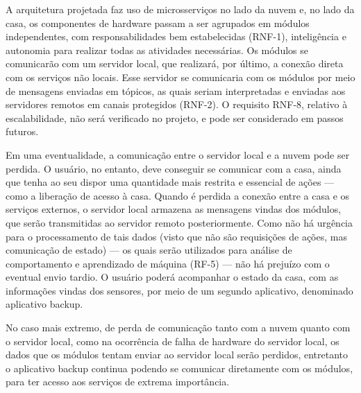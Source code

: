 A arquitetura projetada faz uso de microsserviços no lado da nuvem e, no lado da casa, os componentes de hardware passam a ser agrupados em módulos independentes, com responsabilidades bem estabelecidas (RNF-1), inteligência e autonomia para realizar todas as atividades necessárias. Os módulos se comunicarão com um servidor local, que realizará, por último, a conexão direta com os serviços não locais. Esse servidor se comunicaria com os módulos por meio de mensagens enviadas em tópicos, as quais seriam interpretadas e enviadas aos servidores remotos em canais protegidos (RNF-2). O requisito RNF-8, relativo à escalabilidade, não será verificado no projeto, e pode ser considerado em passos futuros.

Em uma eventualidade, a comunicação entre o servidor local e a nuvem pode ser perdida.  O usuário, no entanto, deve conseguir se comunicar com a casa, ainda que tenha ao seu dispor uma quantidade mais restrita e essencial de ações --- como a liberação de acesso à casa. Quando é perdida a conexão entre a casa e os serviços externos, o servidor local armazena as mensagens vindas dos módulos, que serão transmitidas ao servidor remoto posteriormente. Como não há urgência para o processamento de tais dados (visto que não são requisições de ações, mas comunicação de estado) --- os quais serão utilizados para análise de comportamento e aprendizado de máquina (RF-5) --- não há prejuízo com o eventual envio tardio. O usuário poderá acompanhar o estado da casa, com as informações vindas dos sensores, por meio de um segundo aplicativo, denominado aplicativo backup.

No caso mais extremo, de perda de comunicação tanto com a nuvem quanto com o servidor local, como na ocorrência de falha de hardware do servidor local, os dados que os módulos tentam enviar ao servidor local serão perdidos, entretanto o aplicativo backup continua podendo se comunicar diretamente com os módulos, para ter acesso aos serviços de extrema importância.
